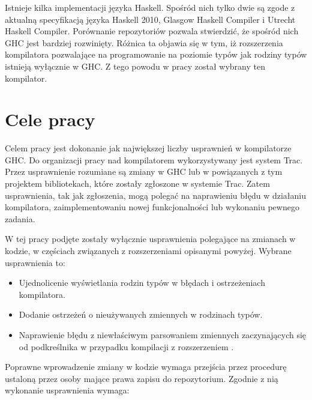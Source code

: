 Istnieje kilka implementacji języka Haskell. Spośród nich tylko dwie są zgode z
aktualną specyfikacją języka Haskell 2010, Glasgow Haskell Compiler i Utrecht
Haskell Compiler\cite{WikiImplementations}. Porównanie repozytoriów pozwala
stwierdzić, że spośród nich GHC jest bardziej rozwinięty. Różnica ta objawia się
w tym, iż rozszerzenia kompilatora pozwalające na programowanie na poziomie
typów jak rodziny typów istnieją wyłącznie w GHC\cite{UHCUserGuide}. Z tego
powodu w pracy został wybrany ten kompilator.


\section{Cele pracy}\label{sec:cele_pracy}

Celem pracy jest dokonanie jak największej liczby usprawnień w kompilatorze
GHC. Do organizacji pracy nad kompilatorem wykorzystywany jest system
Trac. Przez usprawnienie rozumiane są zmiany w GHC lub w powiązanych z tym
projektem bibliotekach, które zostały zgłoszone w systemie Trac. Zatem
usprawnienia, tak jak zgłoszenia, mogą polegać na naprawieniu błędu w działaniu
kompilatora, zaimplementowaniu nowej funkcjonalności lub wykonaniu pewnego
zadania.

W tej pracy podjęte zostały wyłącznie usprawnienia polegające na zmianach w
kodzie, w częściach związanych z rozszerzeniami opisanymi powyżej. Wybrane
usprawnienia to:

\begin{itemize}
 \item Ujednolicenie wyświetlania rodzin typów w błędach i ostrzeżeniach kompilatora.
 \item Dodanie ostrzeżeń o nieużywanych zmiennych w rodzinach typów.
 \item Naprawienie błędu z niewłaściwym parsowaniem zmiennych zaczynających się od podkreślnika w przypadku kompilacji z rozszerzeniem .
\end{itemize}

Poprawne wprowadzenie zmiany w kodzie wymaga przejścia przez procedurę ustaloną
przez osoby mające prawa zapisu do repozytorium\cite{WikiFixingBugs}. Zgodnie z
nią wykonanie usprawnienia wymaga:

